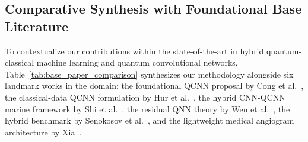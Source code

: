 \documentclass[10pt,twocolumn,twoside,a4paper]{article}
\begin{document}
\subsection{Comparative Synthesis with Foundational Base Literature}
\label{sec:comparative_literature_synthesis}

To contextualize our contributions within the state-of-the-art in hybrid quantum-classical machine learning and quantum convolutional networks, Table~\ref{tab:base_paper_comparison} synthesizes our methodology alongside six landmark works in the domain: the foundational QCNN proposal by Cong et al.~\cite{cong2019quantum}, the classical-data QCNN formulation by Hur et al.~\cite{hur2022quantum}, the hybrid CNN-QCNN marine framework by Shi et al.~\cite{shi2023hybrid}, the residual QNN theory by Wen et al.~\cite{wen2024enhancing}, the hybrid benchmark by Senokosov et al.~\cite{senokosov2024quantum}, and the lightweight medical angiogram architecture by Xia~\cite{xia2026lightweight}.
\end{document}
